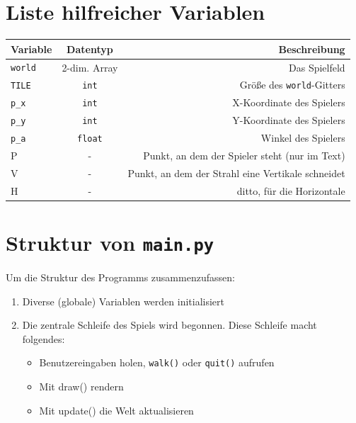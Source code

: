 \documentclass[a4paper,12pt]{report}
\begin{document}
\section{Liste hilfreicher Variablen}
\begin{center}
	\begin{tabular}{|l|c|r|}
		\hline
		Variable & Datentyp & Beschreibung \\ \hline
		\hline
		\texttt{world} & 2-dim. Array & Das Spielfeld \\ \hline
		\texttt{TILE} & \texttt{int} & Gr\"o\ss e des \texttt{world}-Gitters \\ \hline
		\texttt{p\_x} & \texttt{int} & X-Koordinate des Spielers \\ \hline
		\texttt{p\_y} & \texttt{int} & Y-Koordinate des Spielers \\ \hline
		\texttt{p\_a} & \texttt{float} & Winkel des Spielers \\ \hline
		P & - & Punkt, an dem der Spieler steht (nur im Text) \\ \hline
		V & - & Punkt, an dem der Strahl eine Vertikale schneidet \\ \hline
		H & - & ditto, f\"ur die Horizontale \\ \hline
	\end{tabular}
\end{center}

\section{Struktur von \texttt{main.py}}
Um die Struktur des Programms zusammenzufassen:
\begin{spacing}{1.0}
\begin{framed}
\begin{enumerate}
	\item Diverse (globale) Variablen werden initialisiert
	\item Die zentrale Schleife des Spiels wird begonnen. Diese Schleife macht folgendes:
	\begin{itemize}
		\item Benutzereingaben holen, \texttt{walk()} oder \texttt{quit()} aufrufen
		\item Mit draw() rendern
		\item Mit update() die Welt aktualisieren
	\end{itemize}
\end{enumerate}
\end{framed}
\end{spacing}
\end{document}
